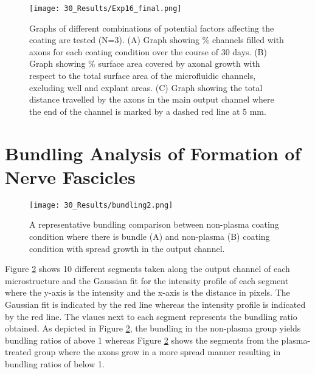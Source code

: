 
\begin{figure}[H]
\centering
\texttt{[image: 30\_Results/Exp16\_final.png]}
\caption{Graphs of different combinations of potential factors affecting the coating are tested (N=3). (A) Graph showing $\%$ channels filled with axons for each coating condition over the course of 30 days. (B) Graph showing $\%$ surface area covered by axonal growth with respect to the total surface area of the microfluidic channels, excluding well and explant areas. (C) Graph showing the total distance travelled by the axons in the main output channel where the end of the channel is marked by a dashed red line at 5 mm. }
\label{fig:Coating_checkResults3}
\end{figure}

\section{Bundling Analysis of Formation of Nerve Fascicles}
\begin{figure}[H]
\centering
\texttt{[image: 30\_Results/bundling2.png]}
\caption{A representative bundling comparison between non-plasma coating condition where there is  bundle (A) and non-plasma (B) coating condition with spread growth in the output channel. }
\label{fig:Bundling}
\end{figure}

Figure \ref{fig:Bundling} shows 10 different segments taken along the output channel of each microstructure and the Gaussian fit for the intensity profile of each segment where the y-axis is the intensity and the x-axis is the distance in pixels. The Gaussian fit is indicated by the red line whereas the intensity profile is indicated by the red line. The vlaues next to each segment represents the bundling ratio obtained. As depicted in Figure \ref{fig:Bundling}, the bundling in the non-plasma group yields bundling ratios of above 1 whereas Figure \ref{fig:Bundling} shows the segments from the plasma-treated group where the axons grow in a more spread manner resulting in bundling ratios of below 1.


